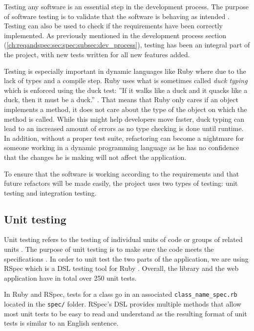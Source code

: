 Testing any software is an essential step in the development process. The purpose of software testing is to validate that the software is behaving as intended \citep{lit:software_testing}. Testing can also be used to check if the requirements have been correctly implemented. As previously mentioned in the development process section (\ref{ch:reqandspec:sec:spec:subsec:dev_process}), testing has been an integral part of the project, with new tests written for all new features added.

Testing is especially important in dynamic languages like Ruby where due to the lack of types and a compile step. Ruby uses what is sometimes called \textit{duck typing} which is enforced using the duck test: ''If it walks like a duck and it quacks like a duck, then it must be a duck.'' \citep{wiki:duck_typing}. That means that Ruby only cares if an object implements a method, it does not care about the type of the object on which the method is called. While this might help developers move faster, duck typing can lead to an increased amount of errors as no type checking is done until runtime. In addition, without a proper test suite, refactoring can become a nightmare for someone working in a dynamic programming language as he has no confidence that the changes he is making will not affect the application.

To ensure that the software is working according to the requirements and that future refactors will be made easily, the project uses two types of testing: unit testing and integration testing.


\subsection{Unit testing}

Unit testing refers to the testing of individual units of code or groups of related units \citep{unit_testing}. The purpose of unit testing is to make sure the code meets the specifications \citep{Olan2003}. In order to unit test the two parts of the application, we are using RSpec which is a DSL testing tool for Ruby \citep{wiki:rspec}. Overall, the library and the web application have in total over 250 unit tests.

In Ruby and RSpec, tests for a class go in an associated \texttt{class\_name\_spec.rb} located in the \texttt{spec/} folder. RSpec's DSL provides multiple methods that allow most unit tests to be easy to read and understand as the resulting format of unit tests is similar to an English sentence.

